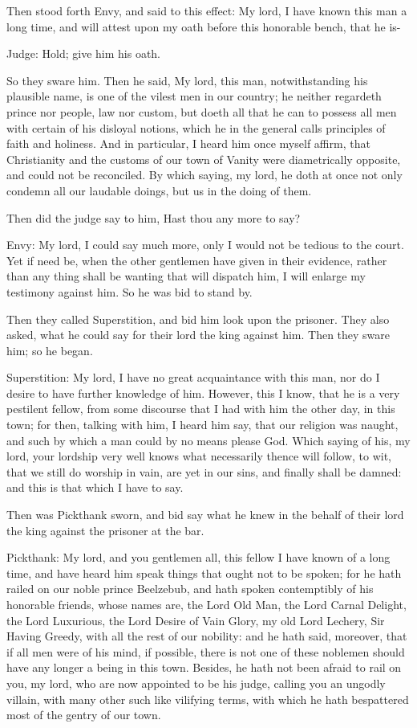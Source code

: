 Then stood forth Envy, and said to this effect: My lord, I have known this man a long time, and will attest upon my oath before this honorable bench, that he is-

Judge: Hold; give him his oath.

So they sware him. Then he said, My lord, this man, notwithstanding his plausible name, is one of the vilest men in our country; he neither regardeth prince nor people, law nor custom, but doeth all that he can to possess all men with certain of his disloyal notions, which he in the general calls principles of faith and holiness. And in particular, I heard him once myself affirm, that Christianity and the customs of our town of Vanity were diametrically opposite, and could not be reconciled. By which saying, my lord, he doth at once not only condemn all our laudable doings, but us in the doing of them.

Then did the judge say to him, Hast thou any more to say?

Envy: My lord, I could say much more, only I would not be tedious to the court. Yet if need be, when the other gentlemen have given in their evidence, rather than any thing shall be wanting that will dispatch him, I will enlarge my testimony against him. So he was bid to stand by.

Then they called Superstition, and bid him look upon the prisoner. They also asked, what he could say for their lord the king against him. Then they sware him; so he began.

Superstition: My lord, I have no great acquaintance with this man, nor do I desire to have further knowledge of him. However, this I know, that he is a very pestilent fellow, from some discourse that I had with him the other day, in this town; for then, talking with him, I heard him say, that our religion was naught, and such by which a man could by no means please God. Which saying of his, my lord, your lordship very well knows what necessarily thence will follow, to wit, that we still do worship in vain, are yet in our sins, and finally shall be damned: and this is that which I have to say.

Then was Pickthank sworn, and bid say what he knew in the behalf of their lord the king against the prisoner at the bar.

Pickthank: My lord, and you gentlemen all, this fellow I have known of a long time, and have heard him speak things that ought not to be spoken; for he hath railed on our noble prince Beelzebub, and hath spoken contemptibly of his honorable friends, whose names are, the Lord Old Man, the Lord Carnal Delight, the Lord Luxurious, the Lord Desire of Vain Glory, my old Lord Lechery, Sir Having Greedy, with all the rest of our nobility: and he hath said, moreover, that if all men were of his mind, if possible, there is not one of these noblemen should have any longer a being in this town. Besides, he hath not been afraid to rail on you, my lord, who are now appointed to be his judge, calling you an ungodly villain, with many other such like vilifying terms, with which he hath bespattered most of the gentry of our town.

